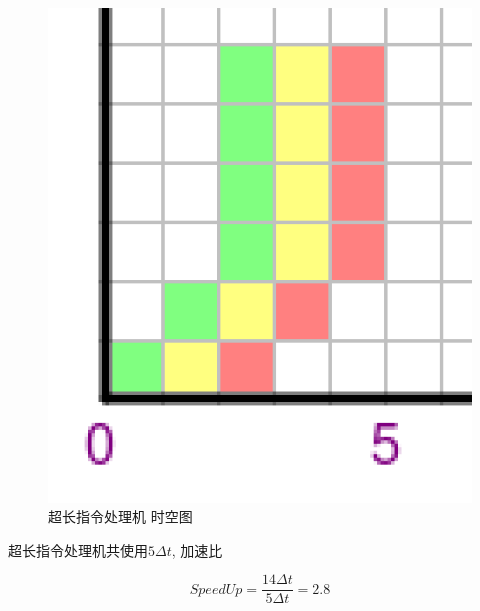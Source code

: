 \documentclass{article}
\begin{document}
\begin{CJK}{UTF8}{gbsn}
\begin{figure}[H]
\centering
\includegraphics[scale=0.3]{hw3-img3.png}
\caption{超长指令处理机 时空图}
\end{figure}

超长指令处理机共使用$5\Delta t$, 加速比

$$SpeedUp = \frac{14\Delta t}{5\Delta t} = 2.8$$


\end{CJK}
\end{document}
